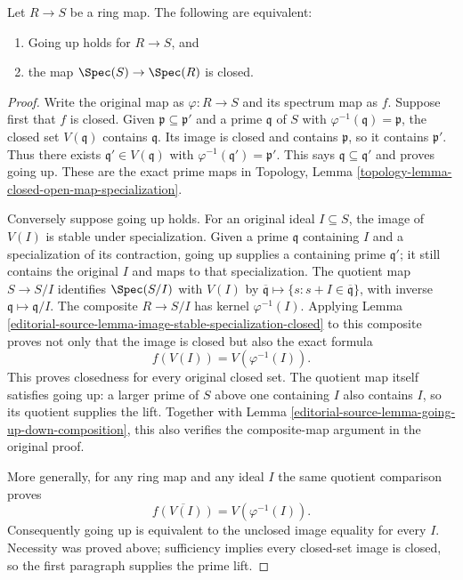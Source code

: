 \begin{lemma}
\label{editorial-source-lemma-going-up-closed}
Let $R \to S$ be a ring map. The following are equivalent:
\begin{enumerate}
\item Going up holds for $R \to S$, and
\item the map $\Spec(S) \to \Spec(R)$ is closed.
\end{enumerate}
\end{lemma}

\begin{proof}
Write the original map as $\varphi:R\to S$ and its
spectrum map as $f$. Suppose first that $f$ is closed.
Given $\mathfrak p\subseteq\mathfrak p'$ and a prime
$\mathfrak q$ of $S$ with $\varphi^{-1}(\mathfrak q)=\mathfrak p$,
the closed set $V(\mathfrak q)$ contains $\mathfrak q$.
Its image is closed and contains $\mathfrak p$, so it
contains $\mathfrak p'$. Thus there exists
$\mathfrak q'\in V(\mathfrak q)$ with
$\varphi^{-1}(\mathfrak q')=\mathfrak p'$.
This says $\mathfrak q\subseteq\mathfrak q'$ and proves
going up. These are the exact prime maps in
Topology, Lemma \ref{topology-lemma-closed-open-map-specialization}.

Conversely suppose going up holds. For an original
ideal $I\subseteq S$, the image of $V(I)$ is stable
under specialization. Given a prime $\mathfrak q$
containing $I$ and a specialization of its contraction,
going up supplies a containing prime $\mathfrak q'$;
it still contains the original $I$ and maps to that
specialization. The quotient map $S\to S/I$ identifies
$\Spec(S/I)$ with $V(I)$ by
$\overline{\mathfrak q}\mapsto\{s:s+I\in\overline{\mathfrak q}\}$,
with inverse $\mathfrak q\mapsto\mathfrak q/I$.
The composite $R\to S/I$ has kernel $\varphi^{-1}(I)$.
Applying Lemma \ref{editorial-source-lemma-image-stable-specialization-closed}
to this composite proves not only that the image is
closed but also the exact formula
$$
f(V(I))=V(\varphi^{-1}(I)).
$$
This proves closedness for every original closed set.
The quotient map itself satisfies going up: a larger
prime of $S$ above one containing $I$ also contains
$I$, so its quotient supplies the lift. Together
with Lemma \ref{editorial-source-lemma-going-up-down-composition}, this
also verifies the composite-map argument in the original proof.

More generally, for any ring map and any ideal $I$
the same quotient comparison proves
$$
\overline{f(V(I))}=V(\varphi^{-1}(I)).
$$
Consequently going up is equivalent to the unclosed
image equality for every $I$. Necessity was proved
above; sufficiency implies every closed-set image is
closed, so the first paragraph supplies the prime lift.
\end{proof}